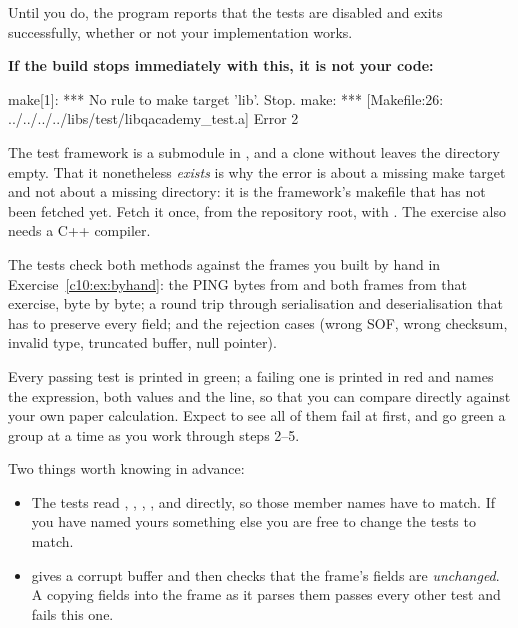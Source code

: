 Until you do, the program reports that the tests are disabled and exits successfully, whether or not
your implementation works.

\begin{aside}
\textbf{If the build stops immediately with this, it is not your code:}

\begin{console}
make[1]: *** No rule to make target 'lib'.  Stop.
make: *** [Makefile:26: ../../../../libs/test/libqacademy_test.a] Error 2
\end{console}

The test framework is a submodule in , and a clone without
 leaves the directory empty. That it nonetheless \emph{exists} is why the
error is about a missing make target and not about a missing directory: it is the framework's
makefile that has not been fetched yet. Fetch it once, from the repository root, with
. The exercise also needs a C++ compiler.
\end{aside}

The tests check both methods against the frames you built by hand in Exercise~\ref{c10:ex:byhand}:
the PING bytes from  and both frames from that exercise, byte by byte; a
round trip through serialisation and deserialisation that has to preserve every field; and the
rejection cases (wrong SOF, wrong checksum, invalid type, truncated buffer, null pointer).

Every passing test is printed in green; a failing one is printed in red and names the expression,
both values and the line, so that you can compare directly against your own paper calculation. Expect
to see all of them fail at first, and go green a group at a time as you work through steps 2--5.

Two things worth knowing in advance:
\begin{itemize}
  \item The tests read , , , ,
     and  directly, so those member names have to match. If you have
    named yours something else you are free to change the tests to match.
  \item {} gives  a corrupt buffer
    and then checks that the frame's fields are \emph{unchanged}. A  copying
    fields into the frame as it parses them passes every other test and fails this one.
\end{itemize}

